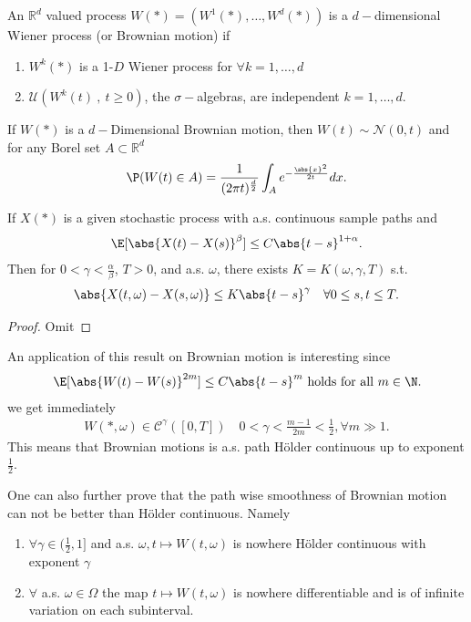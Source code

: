 \begin{definition}
 An $\mathbb{R}^{d} $  valued process $W(*) = (W^{1}(*),\ldots ,W^{d}(*)  )$ is a $d-$dimensional Wiener process (or Brownian motion) if
 \begin{enumerate}
   \item $W^{k}(*) $ is a 1-$D$ Wiener process for $\forall  k =1 ,\ldots ,d$
   \item $\mathcal{U}(W^{k}(t) \ , \ t\ge 0 )$, the $\sigma-$algebras, are independent $k=1,\ldots ,d$.
 \end{enumerate}
\end{definition}
\begin{remark}
 If $W(*)$  is  a $d-$Dimensional Brownian motion, then $W(t) \sim \mathcal{N}(0,t)$ and for any Borel set $A \subset  \mathbb{R}^{d} $
 \begin{align*}
  \P(W(t) \in  A) = \frac{1}{(2\pi t)^{\frac{d}{2}} } \int_A e^{-\frac{\abs{x}^2}{2t}} dx
 .\end{align*}
\end{remark}
\begin{theorem}
 If $X(*)$  is a given stochastic process with a.s. continuous sample paths and 
 \begin{align*}
   \E[\abs{X(t)-X(s)}^{\beta } ] \le  C \abs{t-s}^{1+\alpha } 
 .\end{align*}
 Then for $0< \gamma  < \frac{\alpha }{\beta }$, $T > 0$, and a.s. $\omega$, there exists $ K = K(\omega ,\gamma ,T)$ s.t.
 \begin{align*}
  \abs{X(t,\omega )-X(s,\omega )}\le K \abs{t-s}^{\gamma } \quad \forall  0 \le s, t \le T 
 .\end{align*}
\end{theorem}
\begin{proof}
 Omit 
\end{proof}
An application of this result on Brownian motion is interesting since 
\begin{align*}
  \E[\abs{W(t)-W(s)}^{2m} ] \le  C \abs{t-s}^{m}  \mbox{ holds for all } m\in\N
.\end{align*}
we get immediately 
\begin{align*}
  W(*,\omega ) \in  \mathcal{C}^{\gamma }([0,T])  \quad 0<\gamma <\frac{m-1}{2m} < \frac{1}{2}, \forall  m \gg 1
.\end{align*}
This means that Brownian motions is a.s. path Hölder continuous up to exponent $\frac{1}{2}$.
\begin{remark}
  One can also further prove that the path wise smoothness  of Brownian motion can not be better than Hölder  continuous. Namely 
  \begin{enumerate}
    \item $\forall  \gamma  \in  (\frac{1}{2},1]$  and a.s. $\omega , t \mapsto W(t,\omega )$ is nowhere Hölder  continuous with exponent $\gamma $
    \item $\forall $ a.s. $\omega  \in  \Omega $ the map $t \mapsto W(t,\omega )$ is nowhere differentiable and is of infinite variation on each subinterval.
  \end{enumerate}
\end{remark}
